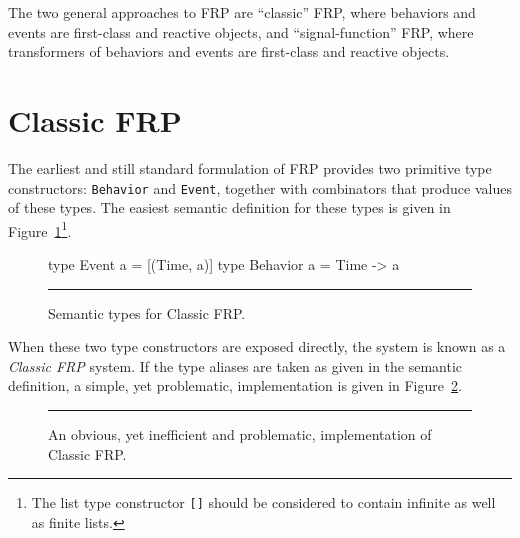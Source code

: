 The two general approaches to FRP are ``classic'' FRP, where behaviors and
events are first-class and reactive objects, and ``signal-function'' FRP, where
transformers of behaviors and events are first-class and reactive objects.

\section{Classic FRP}
\label{section:Background-Classic_FRP}

The earliest and still standard formulation of FRP provides two primitive type
constructors: {\tt Behavior} and {\tt Event}, together with combinators that
produce values of these types. The easiest semantic definition for these types
is given in Figure~\ref{figure:classic_frp_semantic_types}\footnote{The list type constructor {\tt []} should be considered to contain infinite as well as finite lists.}.

\begin{figure}
\begin{code}
type Event a = [(Time, a)]
type Behavior a = Time -> a
\end{code}
\hrule
\caption{Semantic types for Classic FRP.}
\label{figure:classic_frp_semantic_types}
\end{figure}


When these two type constructors are exposed directly, the system is known as a 
{\em Classic FRP} system. If the type aliases are taken as given in the semantic
definition, a simple, yet problematic, implementation is given in
Figure~\ref{figure:classic_frp_simple_implementation}.

\begin{figure}
\hrule
\caption{An obvious, yet inefficient and problematic, implementation of
Classic FRP.}
\label{figure:classic_frp_simple_implementation}
\end{figure}

